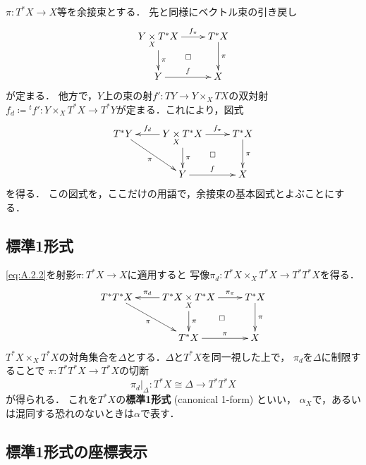 \documentclass[leqno, 10pt, a4paper, dvipdfmx]{jsarticle}
\theoremstyle{definition}
\numberwithin{equation}{section}
\newcommand{\mres}[2][]{{\left.{#1}\right\rvert}_{#2}}
\newcommand{\pb}[1][]{\mathbin{\mathop{\times}\limits_{#1}}}
\newcommand{\tpb}[1][]{\mathbin{\mathop{\times}\nolimits_{#1}}}
\theoremstyle{mystyle}
\newcommand{\mdiff}[1][]{{#1}_{d}} %
\newcommand{\cotb}[1][]{T^{\ast}{#1}}
\begin{document}
\(\pi\colon T^{\ast}X\to X\)等を余接束とする．
先と同様にベクトル束の引き戻し
\[\xymatrix{
  Y\pb[X]T^{\ast}X
  \ar[r]^-{f_{\pi}}
  \ar[d]^-{\pi}
  \ar@{}[dr]|\square
  &
  T^{\ast}X
  \ar[d]^-{\pi}
  \\
  Y\ar[r]^-{f}&X
}\]
が定まる．
他方で，\(Y\)上の束の射\(
  f'\colon TY\to Y\mathbin{\times_{X}}TX
\)の双対射\(
  f_{d}\coloneqq {}^{t\!}f'\colon Y\mathbin{\times_{X}}T^{\ast}X\to T^{\ast}Y
\)が定まる．これにより，図式
\[\xymatrix{
  T^{\ast}Y
  \ar[rd]_-{\pi}
  &
  Y\pb[X]T^{\ast}X
  \ar[l]_-{f_{d}}
  \ar[r]^-{f_{\pi}}
  \ar[d]^-{\pi}
  \ar@{}[dr]|\square
  &
  T^{\ast}X
  \ar[d]^-{\pi}
  \\
  &Y\ar[r]^-{f}&X
}\]
を得る．
この図式を，ここだけの用語で，余接束の基本図式とよぶことにする．

\subsection*{標準1形式}

\eqref{eq:A.2.2}を射影\(\pi\colon \cotb[X]\to X\)に適用すると
写像\(
    \mdiff[\pi]\colon\cotb[X]\tpb[X]\cotb[X]\to\cotb[{\cotb[X]}]
\)を得る．
\begin{equation*}%
    \vcenter{\xymatrix{
      T^{\ast}\cotb[X]
      \ar[rd]_-{\pi}
      &
      \cotb[X]\pb[X]\cotb[X]
      \ar[l]_-{\pi_{d}}
      \ar[r]^-{\pi_{\pi}}
      \ar[d]^-{\pi}
      \ar@{}[dr]|\square
      &
      \cotb[X]
      \ar[d]^-{\pi}
      \\
      &\cotb[X]\ar[r]^-{\pi}&X
}}\end{equation*}
\(\cotb[X]\tpb[X]\cotb[X]\)の対角集合を\(
    \varDelta
\)とする．\(\varDelta\)と\(\cotb[X]\)を同一視した上で，
\(\pi_{d}\)を\(\varDelta\)に制限することで
\(\pi\colon\cotb[{\cotb[X]}]\to\cotb[X]\)の切断
\[
    \mres[\pi_{d}]{\varDelta}\colon
    \cotb[X]
    \cong\varDelta
    \to\cotb[{\cotb[X]}]
\]    
が得られる．
これを\(\cotb[X]\)の\textbf{標準1形式} (canonical 1-form) といい，
\(\alpha_X\)で，あるいは混同する恐れのないときは\(\alpha\)で表す．

\subsection*{標準1形式の座標表示}
\end{document}

